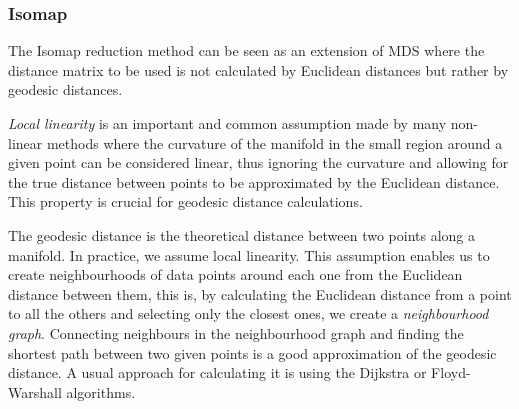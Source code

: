     \subsubsection{Isomap} 
        The Isomap \cite{isomap} reduction method can be seen as an extension of MDS where the distance matrix to be used is not calculated by Euclidean distances but rather by geodesic distances.

        
        
        
        \textit{Local linearity} is an important and common assumption made by many non-linear methods where the curvature of the manifold in the small region around a given point can be considered linear, thus ignoring the curvature and allowing for the true distance between points to be approximated by the Euclidean distance. This property is crucial for geodesic distance calculations.

        The geodesic distance is the theoretical distance between two points along a manifold. In practice, we assume local linearity. This assumption enables us to create neighbourhoods of data points around each one from the Euclidean distance between them, this is, by calculating the Euclidean distance from a point to all the others and selecting only the closest ones, we create a \textit{neighbourhood graph}.
        Connecting neighbours in the neighbourhood graph and finding the shortest path between two given points is a good approximation of the geodesic distance. A usual approach for calculating it is using the Dijkstra or Floyd-Warshall algorithms. \\

